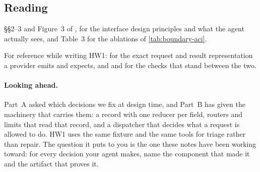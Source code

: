 \subsection{Reading}

\S\S2--3 and Figure~3 of \citet{yang2024sweagent}, for the interface design principles
and what the agent actually sees, and Table~3 for the ablations of \cref{tab:boundary-aci}.

For reference while writing HW1: \citet{anthropic-tooluse} for the exact request and result
representation a provider emits and expects, and  and 
for the checks that stand between the two.

\paragraph{Looking ahead.} Part~A asked which decisions we fix at design time, and Part~B has given
the machinery that carries them: a record with one reducer per field, routers and limits that read
that record, and a dispatcher that decides what a request is allowed to do. HW1 uses the same
fixture and the same tools for triage rather than repair. The question it puts to you is the one
these notes have been working toward: for every decision your agent makes, name the component that
made it and the artifact that proves it.
